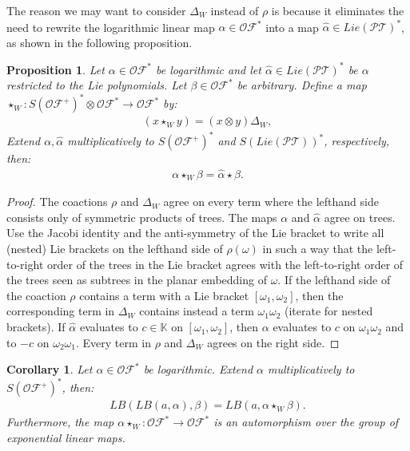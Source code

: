 \documentclass[10pt,a4paper]{article}
\newtheorem{corollary}{Corollary}[theorem]
\newtheorem{proposition}[theorem]{Proposition}
\begin{document}
The reason we may want to consider $\Delta_W$ instead of $\rho$ is because it eliminates the need to rewrite the logarithmic linear map $\alpha \in \mathcal{OF}^{\ast}$ into a map $\hat{\alpha}\in Lie(\mathcal{PT})^{\ast}$, as shown in the following proposition.

\begin{proposition}
Let $\alpha \in \mathcal{OF}^{\ast}$ be logarithmic and let $\hat{\alpha}\in Lie(\mathcal{PT})^{\ast}$ be $\alpha$ restricted to the Lie polynomials. Let $\beta \in \mathcal{OF}^{\ast}$ be arbitrary. Define a map $\star_W : S(\mathcal{OF}^+)^{\ast} \otimes \mathcal{OF}^{\ast} \to \mathcal{OF}^{\ast}$ by:
\begin{align*}
(x \star_W y)=(x \otimes y)\Delta_W,
\end{align*}
Extend $\alpha,\hat{\alpha}$ multiplicatively to $S(\mathcal{OF}^+)^{\ast}$ and $S(Lie(\mathcal{PT}))^{\ast}$, respectively, then:
\begin{align*}
\alpha \star_W \beta = \hat{\alpha} \star \beta.
\end{align*}
\end{proposition}

\begin{proof}
The coactions $\rho$ and $\Delta_W$ agree on every term where the lefthand side consists only of symmetric products of trees. The maps $\alpha$ and $\hat{\alpha}$ agree on trees. Use the Jacobi identity and the anti-symmetry of the Lie bracket to write all (nested) Lie brackets on the lefthand side of $\rho(\omega)$ in such a way that the left-to-right order of the trees in the Lie bracket agrees with the left-to-right order of the trees seen as subtrees in the planar embedding of $\omega$. If the lefthand side of the coaction $\rho$ contains a term with a Lie bracket $[\omega_1,\omega_2]$, then the corresponding term in $\Delta_W$ contains instead a term $\omega_1\omega_2$ (iterate for nested brackets). If $\hat{\alpha}$ evaluates to $c\in \mathbb{K}$ on $[\omega_1,\omega_2]$, then $\alpha$ evaluates to $c$ on $\omega_1\omega_2$ and to $-c$ on $\omega_2\omega_1$.  Every term in $\rho$ and $\Delta_W$ agrees on the right side.
\end{proof}

\begin{corollary}
Let $\alpha \in \mathcal{OF}^{\ast}$ be logarithmic. Extend $\alpha$ multiplicatively to $S(\mathcal{OF}^+)^{\ast}$, then:
\begin{align*}
LB(LB(a,\alpha),\beta)=LB(a,\alpha \star_W \beta).
\end{align*}
Furthermore, the map $\alpha \star_W : \mathcal{OF}^{\ast} \to \mathcal{OF}^{\ast}$ is an automorphism over the group of exponential linear maps.
\end{corollary}
\end{document}
